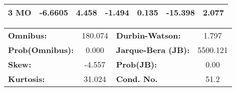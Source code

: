 \begin{center}
\begin{tabular}{lcccccc}
\textbf{3 MO}    &      -6.6605  &        4.458     &    -1.494  &         0.135        &      -15.398    &        2.077     \\
\bottomrule
\end{tabular}
\begin{tabular}{lclc}
\textbf{Omnibus:}       & 180.074 & \textbf{  Durbin-Watson:     } &    1.797  \\
\textbf{Prob(Omnibus):} &   0.000 & \textbf{  Jarque-Bera (JB):  } & 5500.121  \\
\textbf{Skew:}          &  -4.557 & \textbf{  Prob(JB):          } &     0.00  \\
\textbf{Kurtosis:}      &  31.024 & \textbf{  Cond. No.          } &     51.2  \\
\bottomrule
\end{tabular}
\end{center}

